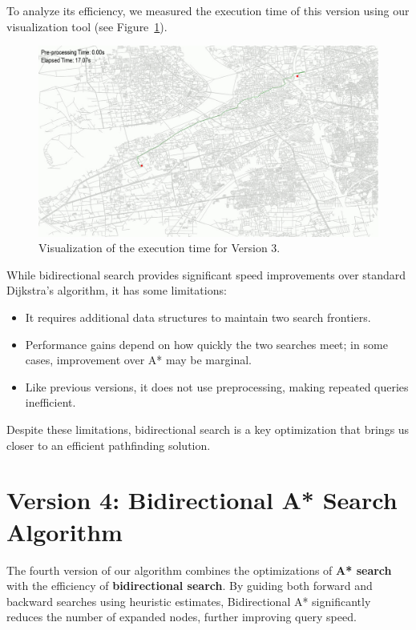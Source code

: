 	To analyze its efficiency, we measured the execution time of this version using our visualization tool (see Figure~\ref{fig:bidirectional_timing}).
	
	\begin{figure}[h]
		\centering
		\includegraphics[width=1.0\textwidth]{bidirectional_dijkstra.png}
		\caption{Visualization of the execution time for Version 3.}
		\label{fig:bidirectional_timing}
	\end{figure}
	
	While bidirectional search provides significant speed improvements over standard Dijkstra’s algorithm, it has some limitations:
	\begin{itemize}
		\item It requires additional data structures to maintain two search frontiers.
		\item Performance gains depend on how quickly the two searches meet; in some cases, improvement over A* may be marginal.
		\item Like previous versions, it does not use preprocessing, making repeated queries inefficient.
	\end{itemize}
	
	Despite these limitations, bidirectional search is a key optimization that brings us closer to an efficient pathfinding solution.
	
	\section{Version 4: Bidirectional A* Search Algorithm}
	
	The fourth version of our algorithm combines the optimizations of \textbf{A* search} with the efficiency of \textbf{bidirectional search}. By guiding both forward and backward searches using heuristic estimates, Bidirectional A* significantly reduces the number of expanded nodes, further improving query speed.
	
